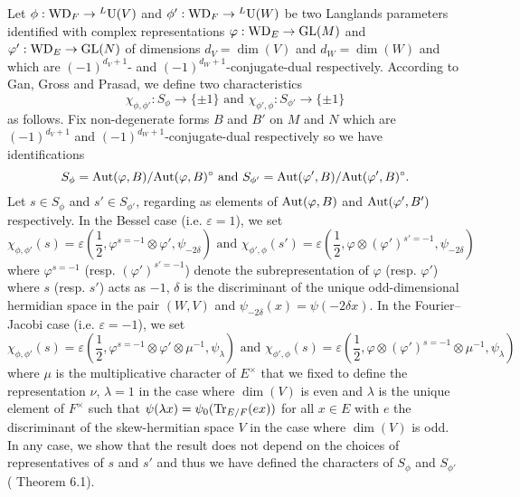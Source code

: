 Let $\phi: \mathrm{WD}_F \to {}^L \mathrm{U}(V)$ and $\phi': \mathrm{WD}_F \to {}^L \mathrm{U}(W)$ be two Langlands parameters identified with complex representations $\varphi: \mathrm{WD}_E \to \mathrm{GL}(M)$ and $\varphi': \mathrm{WD}_E \to \mathrm{GL}(N)$ of dimensions $d_V = \dim(V)$ and $d_W = \dim(W)$ and which are $(-1)^{d_V + 1}$- and $(-1)^{d_W + 1}$-conjugate-dual respectively.
According to Gan, Gross and Prasad, we define two characteristics
\[
    \chi_{\phi, \phi'}: S_\phi \to \{ \pm 1\}\text{ and } \chi_{\phi', \phi}:S_{\phi'} \to \{\pm1\}
\]
as follows.
Fix non-degenerate forms $B$ and $B'$ on $M$ and $N$ which are $(-1)^{d_V + 1}$ and $(-1)^{d_W + 1}$-conjugate-dual respectively so we have identifications
\[
    S_\phi = \mathrm{Aut}(\varphi, B) / \mathrm{Aut}(\varphi, B)^\circ \text{ and } S_{\phi'} = \mathrm{Aut}(\varphi', B) / \mathrm{Aut}(\varphi', B)^\circ.
\]
Let $s \in S_\phi$ and $s' \in S_{\phi'}$, regarding as elements of $\mathrm{Aut}(\varphi, B)$ and $\mathrm{Aut}(\varphi', B')$ respectively.
In the Bessel case (i.e. $\varepsilon = 1$), we set
\[
    \chi_{\phi, \phi'}(s) = \varepsilon\left(\frac{1}{2}, \varphi^{s = -1} \otimes \varphi', \psi_{-2\delta}\right) \text{ and } \chi_{\phi', \phi}(s') = \varepsilon\left(\frac{1}{2}, \varphi \otimes (\varphi')^{s' = -1}, \psi_{-2\delta}\right)
\]
where $\varphi^{s=-1}$ (resp. $(\varphi')^{s' = -1}$) denote the subrepresentation of $\varphi$ (resp. $\varphi'$) where $s$ (resp. $s'$) acts as $-1$, $\delta$ is the discriminant of the unique odd-dimensional hermidian space in the pair $(W, V)$ and $\psi_{-2\delta}(x) = \psi(-2\delta x)$.
In the Fourier--Jacobi case (i.e. $\varepsilon = -1$), we set
\[
    \chi_{\phi, \phi'}(s) = \varepsilon\left(\frac{1}{2}, \varphi^{s = -1} \otimes \varphi' \otimes \mu^{-1}, \psi_\lambda\right) \text{ and } \chi_{\phi', \phi}(s) = \varepsilon\left(\frac{1}{2}, \varphi \otimes (\varphi')^{s=-1} \otimes \mu^{-1}, \psi_\lambda\right)
\]
where $\mu$ is the multiplicative character of $E^\times$ that we fixed to define the representation $\nu$, $\lambda = 1$ in the case where $\dim(V)$ is even and $\lambda$ is the unique element of $F^\times$ such that $\psi(\lambda x) = \psi_0(\mathrm{Tr}_{E/F}(ex))$ for all $x \in E$ with $e$ the discriminant of the skew-hermitian space $V$ in the case where $\dim(V)$ is odd.
In any case, we show that the result does not depend on the choices of representatives of $s$ and $s'$ and thus we have defined the characters of $S_\phi$ and $S_{\phi'}$ (\cite{gan2011symplectic} Theorem 6.1).


